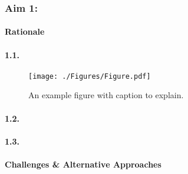 \newcommand{\FigInc}{%
\begin{wrapfigure}{R}{3.05in}
  \begin{mdframed}
  \texttt{[image: ./Figures/Figure.pdf]}
  \caption{An example figure with caption to explain.}
  \label{incFigure}
  \end{mdframed}
\end{wrapfigure}}

\subsubsection{Aim 1: \SpecificAimOne}

\paragraph{Rationale}


\paragraph{1.1. \SpecificAimOneA}

\FigInc
\lipsum[2-2]

\paragraph{1.2. \SpecificAimOneB}

\lipsum[3-3]

\paragraph{1.3. \SpecificAimOneC}

\lipsum[4-4]

\paragraph{Challenges \& Alternative Approaches}

\lipsum[6-6]
